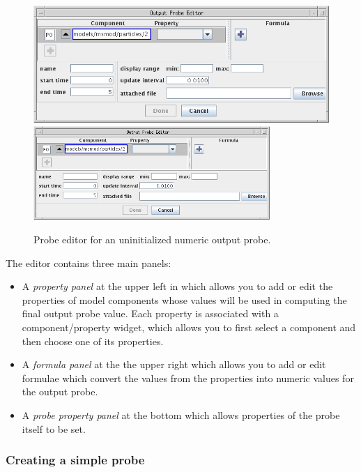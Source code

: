 \documentclass{article}
\begin{document}
\begin{figure}
\begin{center}
\iflatexml
\includegraphics[]{images/outputProbeEditorA}
\else
\includegraphics[width=0.80\textwidth]{images/outputProbeEditorA}
\fi
\end{center}
\caption{Probe editor for an uninitialized numeric output probe.}%
\label{OutputProbeEditorAFig}
\end{figure}

The editor contains three main panels:

\begin{itemize}

\item A {\it property panel} at the upper left in which allows you
to add or edit the properties of model components whose values will be used in
computing the final output probe value. Each property is
associated with a component/property widget, which allows you to first
select a component and then choose one of its properties.

\item A {\it formula panel} at the the upper right which allows
you to add or edit formulae which convert the values from
the properties into numeric values for the output probe.

\item A {\it probe property panel} at the bottom which allows properties of
the probe itself to be set.

\end{itemize}

\subsubsection{Creating a simple probe}
\label{simpleOutputProbeSec}
\end{document}
